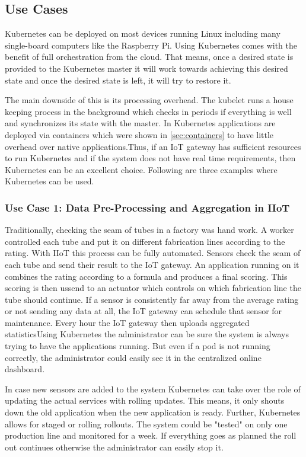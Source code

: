 \subsection{Use Cases}
Kubernetes can be deployed on most devices running Linux including many single-board computers like the Raspberry Pi. Using Kubernetes comes with the benefit of full orchestration from the cloud. That means, once a desired state is provided to the Kubernetes master it will work towards achieving this desired state and once the desired state is left, it will try to restore it. 

The main downside of this is its processing overhead. The kubelet runs a house keeping process in the background which checks in periods if everything is well and synchronizes its state with the master. In Kubernetes applications are deployed via containers which were shown in \cref{sec:containers} to have little overhead over native applications.Thus, if an IoT gateway has sufficient resources to run Kubernetes and if the system does not have real time requirements, then Kubernetes can be an excellent choice. Following are three examples where Kubernetes can be used. 

\subsubsection{Use Case 1: Data Pre-Processing and Aggregation in IIoT}
Traditionally, checking the seam of tubes in a factory was hand work. A worker controlled each tube and put it on different fabrication lines according to the rating. With IIoT this process can be fully automated. Sensors check the seam of each tube and send their result to the IoT gateway. An application running on it combines the rating according to a formula and produces a final scoring. This scoring is then ussend to an actuator which controls on which fabrication line the tube should continue. If a sensor is consistently far away from the average rating or not sending any data at all, the IoT gateway can schedule that sensor for maintenance. Every hour the IoT gateway then uploads aggregated statisticsUsing Kubernetes the administrator can be sure the system is always trying to have the applications running. But even if a pod is not running correctly, the administrator could easily see it in the centralized online dashboard. 

In case new sensors are added to the system Kubernetes can take over the role of updating the actual services with rolling updates. This means, it only shouts down the old application when the new application is ready. Further, Kubernetes allows for staged or rolling rollouts. The system could be "tested" on only one production line and monitored for a week. If everything goes as planned the roll out continues otherwise the administrator can easily stop it. 

